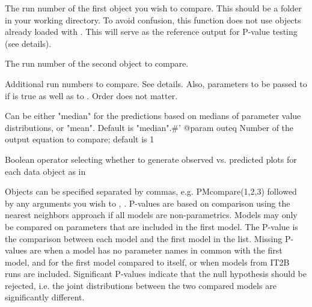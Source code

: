 \documentclass[a4paper]{book}
\begin{document}
\begin{Arguments}
\begin{ldescription}
\item[\code{x}] The run number of the first object you wish to compare. This should be a folder in your
working directory. To avoid confusion, this function does not use objects
already loaded with .
This will serve as the reference output for P-value testing (see details).

\item[\code{y}] The run number of the second object to compare.

\item[\code{...}] Additional run numbers to compare.  See details.  Also, parameters to be passed to  
if  is true as well as to .  Order does not matter.

\item[\code{icen}] Can be either "median" for the predictions based on medians of  parameter value
distributions, or "mean".  Default is "median".\#' @param outeq Number of the output equation to compare; default is 1

\item[\code{plot}] Boolean operator selecting whether to generate observed vs. predicted plots for each data object
as in 
\end{ldescription}
\end{Arguments}
%
\begin{Details}\relax
Objects can be specified separated by commas, e.g. PMcompare(1,2,3) followed by
any arguments you wish to , . P-values are based on comparison using the nearest neighbors
approach if all models are non-parametrics.  Models may only be compared on parameters that are included
in the first model.  The P-value is the comparison between each model and the first model in
the list.  Missing P-values are when a model has no parameter names in common with the first
model, and for the first model compared to itself, or when models from IT2B runs are included.  Significant P-values indicate that the null
hypothesis should be rejected, i.e. the joint distributions between the two compared models are 
significantly different.
\end{Details}
%
\end{document}
